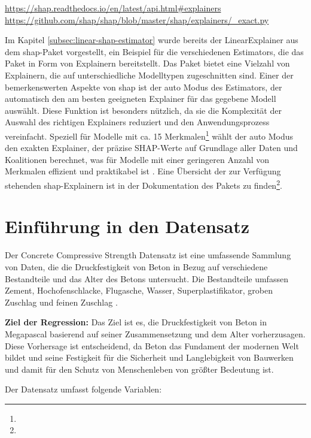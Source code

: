 \urldef{\shapurl}\url{https://shap.readthedocs.io/en/latest/api.html#explainers}
\urldef{\exacturl}\url{https://github.com/shap/shap/blob/master/shap/explainers/_exact.py}

Im Kapitel \ref{subsec:linear-shap-estimator} wurde bereits der LinearExplainer aus dem \textsf{shap}-Paket 
vorgestellt, ein Beispiel für die verschiedenen Estimators, die das Paket in Form von Explainern bereitstellt. 
Das Paket bietet eine Vielzahl von Explainern, die auf unterschiedliche Modelltypen zugeschnitten sind. 
Einer der bemerkenswerten Aspekte von \textsf{shap} ist der auto Modus des Estimators, 
der automatisch den am besten geeigneten Explainer für das gegebene Modell auswählt. 
Diese Funktion ist besonders nützlich, da sie die Komplexität der Auswahl des richtigen Explainers 
reduziert und den Anwendungsprozess vereinfacht. Speziell für Modelle mit ca. 15 Merkmalen\footnote{\exacturl} wählt der 
auto Modus den exakten Explainer, der präzise SHAP-Werte auf Grundlage aller Daten und Koalitionen berechnet, was für Modelle mit einer geringeren Anzahl 
von Merkmalen effizient und praktikabel ist \cite[S. 40f]{Molnar_2023}. Eine Übersicht der zur Verfügung stehenden \textsf{shap}-Explainern ist in der
Dokumentation des Pakets zu finden\footnote{\shapurl}. 


\section{Einführung in den Datensatz}


Der Concrete Compressive Strength Datensatz ist eine umfassende Sammlung von Daten, 
die die Druckfestigkeit von Beton in Bezug auf verschiedene Bestandteile und das Alter des Betons untersucht. 
Die Bestandteile umfassen Zement, Hochofenschlacke, Flugasche, Wasser, Superplastifikator, 
groben Zuschlag und feinen Zuschlag \cite{misc_concrete_compressive_strength_165}.

\textbf{Ziel der Regression:} Das Ziel ist es, die Druckfestigkeit von Beton in Megapascal basierend 
auf seiner Zusammensetzung und dem Alter vorherzusagen. Diese Vorhersage ist entscheidend, 
da Beton das Fundament der modernen Welt bildet und seine Festigkeit für die Sicherheit und 
Langlebigkeit von Bauwerken und damit für den Schutz von Menschenleben von größter Bedeutung ist.

Der Datensatz umfasst folgende Variablen:


